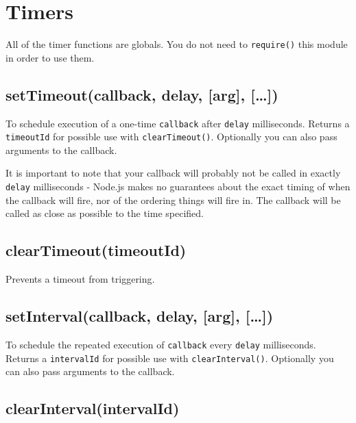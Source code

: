 \section{Timers}\label{timers}

\begin{Shaded}
\begin{Highlighting}[]
 
\end{Highlighting}
\end{Shaded}

All of the timer functions are globals. You do not need to
\texttt{require()} this module in order to use them.

\subsection{setTimeout(callback, delay, {[}arg{]},
{[}\ldots{}{]})}\label{settimeoutcallback-delay-arg}

To schedule execution of a one-time \texttt{callback} after
\texttt{delay} milliseconds. Returns a \texttt{timeoutId} for possible
use with \texttt{clearTimeout()}. Optionally you can also pass arguments
to the callback.

It is important to note that your callback will probably not be called
in exactly \texttt{delay} milliseconds - Node.js makes no guarantees
about the exact timing of when the callback will fire, nor of the
ordering things will fire in. The callback will be called as close as
possible to the time specified.

\subsection{clearTimeout(timeoutId)}\label{cleartimeouttimeoutid}

Prevents a timeout from triggering.

\subsection{setInterval(callback, delay, {[}arg{]},
{[}\ldots{}{]})}\label{setintervalcallback-delay-arg}

To schedule the repeated execution of \texttt{callback} every
\texttt{delay} milliseconds. Returns a \texttt{intervalId} for possible
use with \texttt{clearInterval()}. Optionally you can also pass
arguments to the callback.

\subsection{clearInterval(intervalId)}\label{clearintervalintervalid}

